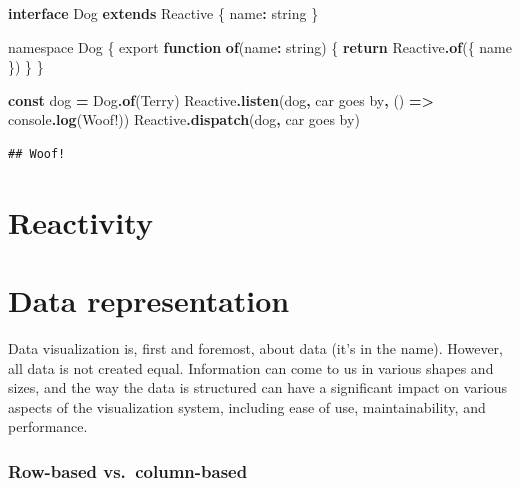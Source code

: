 \documentclass[
]{book}
\newenvironment{Shaded}{\begin{snugshade}}{\end{snugshade}}
\newcommand{\BuiltInTok}[1]{#1}
\newcommand{\ControlFlowTok}[1]{\textcolor[rgb]{0.13,0.29,0.53}{\textbf{#1}}}
\newcommand{\DataTypeTok}[1]{\textcolor[rgb]{0.13,0.29,0.53}{#1}}
\newcommand{\FunctionTok}[1]{\textcolor[rgb]{0.13,0.29,0.53}{\textbf{#1}}}
\newcommand{\ImportTok}[1]{#1}
\newcommand{\KeywordTok}[1]{\textcolor[rgb]{0.13,0.29,0.53}{\textbf{#1}}}
\newcommand{\NormalTok}[1]{#1}
\newcommand{\OperatorTok}[1]{\textcolor[rgb]{0.81,0.36,0.00}{\textbf{#1}}}
\newcommand{\VerbatimStringTok}[1]{\textcolor[rgb]{0.31,0.60,0.02}{#1}}
\theoremstyle{definition}
\theoremstyle{definition}
\theoremstyle{definition}
\theoremstyle{definition}
\theoremstyle{remark}
\begin{document}
\begin{Shaded}
\begin{Highlighting}[]
\KeywordTok{interface}\NormalTok{ Dog }\KeywordTok{extends}\NormalTok{ Reactive \{}
\NormalTok{  name}\OperatorTok{:} \DataTypeTok{string}
\NormalTok{\}}

\ImportTok{namespace} \DataTypeTok{Dog}\NormalTok{ \{}
  \ImportTok{export} \KeywordTok{function} \KeywordTok{of}\NormalTok{(name}\OperatorTok{:} \DataTypeTok{string}\NormalTok{) \{}
    \ControlFlowTok{return}\NormalTok{ Reactive}\OperatorTok{.}\FunctionTok{of}\NormalTok{(\{ name \})}
\NormalTok{  \}}
\NormalTok{\}}

\KeywordTok{const}\NormalTok{ dog }\OperatorTok{=}\NormalTok{ Dog}\OperatorTok{.}\FunctionTok{of}\NormalTok{(}\VerbatimStringTok{\textasciigrave{}Terry\textasciigrave{}}\NormalTok{)}
\NormalTok{Reactive}\OperatorTok{.}\FunctionTok{listen}\NormalTok{(dog}\OperatorTok{,} \VerbatimStringTok{\textasciigrave{}car goes by\textasciigrave{}}\OperatorTok{,}\NormalTok{ () }\KeywordTok{=\textgreater{}} \BuiltInTok{console}\OperatorTok{.}\FunctionTok{log}\NormalTok{(}\VerbatimStringTok{\textasciigrave{}Woof!\textasciigrave{}}\NormalTok{))}
\NormalTok{Reactive}\OperatorTok{.}\FunctionTok{dispatch}\NormalTok{(dog}\OperatorTok{,} \VerbatimStringTok{\textasciigrave{}car goes by\textasciigrave{}}\NormalTok{)}
\end{Highlighting}
\end{Shaded}

\begin{verbatim}
## Woof!
\end{verbatim}

\section{Reactivity}\label{reactivity}

\section{Data representation}\label{data-representation}

Data visualization is, first and foremost, about data (it's in the name). However, all data is not created equal. Information can come to us in various shapes and sizes, and the way the data is structured can have a significant impact on various aspects of the visualization system, including ease of use, maintainability, and performance.

\subsubsection{Row-based vs.~column-based}\label{row-based-vs.-column-based}
\end{document}
